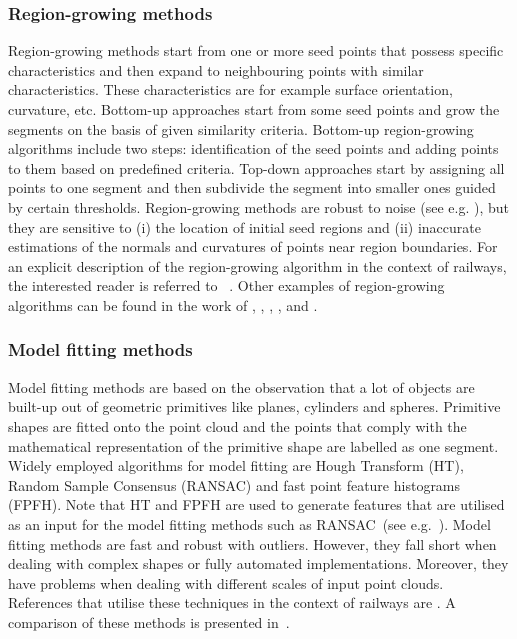 \subsubsection{Region-growing methods}
Region-growing methods start from one or more seed points that possess specific characteristics and then expand to neighbouring points with similar characteristics. These characteristics are for example surface orientation, curvature, etc. Bottom-up approaches start from some seed points and grow the segments on the basis of given similarity criteria. Bottom-up region-growing algorithms include two steps: identification of the seed points and adding points to them based on predefined criteria. Top-down approaches start by assigning all points to one segment and then subdivide the segment into smaller ones guided by certain thresholds. Region-growing methods are robust to noise (see e.g. \cite{lu2021supervoxel}), but they are sensitive to (i) the location of initial seed regions and (ii) inaccurate estimations of the normals and curvatures of points near region boundaries. For an explicit description of the region-growing algorithm in the context of railways, the interested reader is referred to~\citeauthor{cserep2022effective} \cite[Algorithm~1 and Algorithm~2]{cserep2022effective}.
Other examples of region-growing algorithms can be found in the work of \citeauthor{arastounia2017enhanced} \cite{arastounia2017enhanced}, \citeauthor{chbeir2015detection} \cite{chbeir2015detection}, 
\citeauthor{zhang2016automatic} \cite{zhang2016automatic}, \citeauthor{lu2021bolt} \cite{lu2021bolt}, and \citeauthor{zou2019efficient} \cite{zou2019efficient}. 

\subsubsection{Model fitting methods}
Model fitting methods are based on the observation that a lot of objects are built-up out of geometric primitives like planes, cylinders and spheres. Primitive shapes are fitted onto the point cloud and the points that comply with the mathematical representation of the primitive shape are labelled as one segment. Widely employed algorithms for model fitting are Hough Transform (HT), Random Sample Consensus (RANSAC) and fast point feature histograms (FPFH). Note that HT and FPFH are used to generate features that are utilised as an input for the model fitting methods such as RANSAC~(see e.g.~\cite{li20233D}). Model fitting methods are fast and robust with outliers. However, they fall short when dealing with complex shapes or fully automated implementations. Moreover, they have problems when dealing with different scales of input point clouds.
References that utilise these techniques in the context of railways are 
\cite{arastounia2016application,ariyachandra2020digital,benhmida2011from,beger2011data,oudeelberink2013rail,pastucha2016catenary}. 
A comparison of these methods is presented in~\cite{cserep2022effective}.

